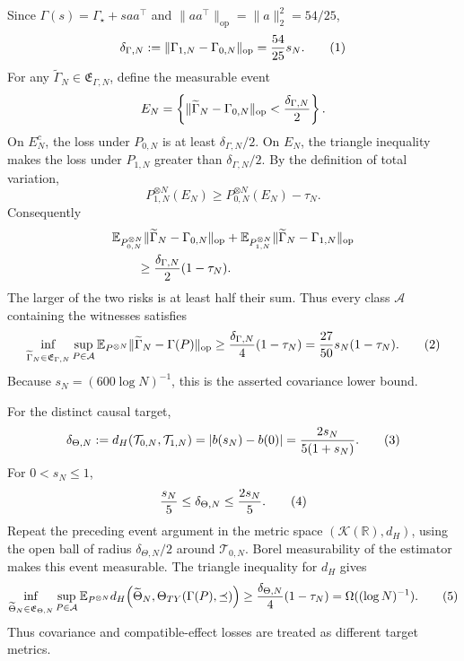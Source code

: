 Since \(\Gamma(s)=\Gamma_\star+saa^\top\) and \(\|aa^\top\|_{\mathrm{op}}=\|a\|_2^2=54/25\),
\[
 \delta_{\Gamma,N}:=\|\Gamma_{1,N}-\Gamma_{0,N}\|_{\mathrm{op}}
 ={54\over25}s_N. \tag{1}
\]
For any \(\widetilde\Gamma_N\in\mathfrak E_{\Gamma,N}\), define the measurable event
\[
 E_N=\left\{\|\widetilde\Gamma_N-\Gamma_{0,N}\|_{\mathrm{op}}
 <{\delta_{\Gamma,N}\over2}\right\}.
\]
On \(E_N^c\), the loss under \(P_{0,N}\) is at least \(\delta_{\Gamma,N}/2\).  On \(E_N\), the triangle inequality makes the loss under \(P_{1,N}\) greater than \(\delta_{\Gamma,N}/2\).  By the definition of total variation,
\[
 P_{1,N}^{\otimes N}(E_N)
 \ge P_{0,N}^{\otimes N}(E_N)-\tau_N.
\]
Consequently
\[
 \begin{aligned}
 &\mathbb E_{P_{0,N}^{\otimes N}}
   \|\widetilde\Gamma_N-\Gamma_{0,N}\|_{\mathrm{op}}
 +\mathbb E_{P_{1,N}^{\otimes N}}
   \|\widetilde\Gamma_N-\Gamma_{1,N}\|_{\mathrm{op}}\\
 &\qquad\ge{\delta_{\Gamma,N}\over2}(1-\tau_N).
 \end{aligned}
\]
The larger of the two risks is at least half their sum.  Thus every class \(\mathcal A\) containing the witnesses satisfies
\[
 \inf_{\widetilde\Gamma_N\in\mathfrak E_{\Gamma,N}}
 \sup_{P\in\mathcal A}
 \mathbb E_{P^{\otimes N}}\|\widetilde\Gamma_N-\Gamma(P)\|_{\mathrm{op}}
 \ge {\delta_{\Gamma,N}\over4}(1-\tau_N)
 ={27\over50}s_N(1-\tau_N). \tag{2}
\]
Because \(s_N=(600\log N)^{-1}\), this is the asserted covariance lower bound.

For the distinct causal target,
\[
 \delta_{\Theta,N}:=d_H(\mathcal T_{0,N},\mathcal T_{1,N})
 =|b(s_N)-b(0)|={2s_N\over5(1+s_N)}. \tag{3}
\]
For \(0<s_N\le1\),
\[
 {s_N\over5}\le\delta_{\Theta,N}\le{2s_N\over5}. \tag{4}
\]
Repeat the preceding event argument in the metric space \((\mathcal K(\mathbb R),d_H)\), using the open ball of radius \(\delta_{\Theta,N}/2\) around \(\mathcal T_{0,N}\).  Borel measurability of the estimator makes this event measurable.  The triangle inequality for \(d_H\) gives
\[
 \inf_{\widetilde\Theta_N\in\mathfrak E_{\Theta,N}}
 \sup_{P\in\mathcal A}
 \mathbb E_{P^{\otimes N}}
 d_H\!\left(\widetilde\Theta_N,
 \Theta_{TY}(\Gamma(P),\preceq)\right)
 \ge {\delta_{\Theta,N}\over4}(1-\tau_N)
 =\Omega((\log N)^{-1}). \tag{5}
\]
Thus covariance and compatible-effect losses are treated as different target metrics.

